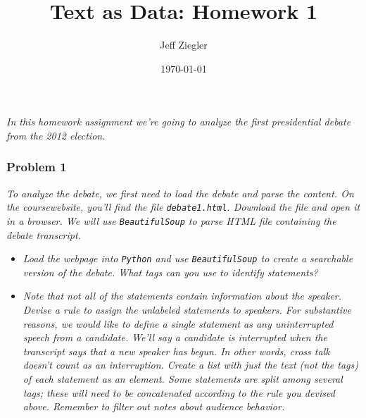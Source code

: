 \documentclass[12pt,letterpaper]{article}
\title{Text as Data: Homework 1}
\date{\today}
\author{Jeff Ziegler}
\begin{document}
\maketitle

\noindent \textit{In this homework assignment we're going to analyze the first presidential debate from the 2012 election.}  \\

\subsubsection*{Problem 1}
\textit{To analyze the debate, we first need to load the debate and parse the content.  On the coursewebsite, you'll find the file {\tt debate1.html}.  Download the file and open it in a browser. We will use {\tt BeautifulSoup} to parse HTML file containing the debate transcript.}

\begin{itemize}
\item \textit{Load the webpage into {\tt Python} and use {\tt BeautifulSoup} to create a searchable version of the debate. What tags can you use to identify statements?}



\item \textit{Note that not all of the statements contain information about the speaker. Devise a rule to assign the unlabeled statements to speakers. For substantive reasons, we would like to define a single statement as any \textit{uninterrupted} speech from a candidate. We'll say a candidate is interrupted when the transcript says that a new speaker has begun.  In other words, cross talk doesn't count as an interruption. Create a list with just the text (not the tags) of each statement as an element. Some statements are split among several tags; these will need to be concatenated according to the rule you devised above. Remember to filter out notes about audience behavior.}



\end{itemize}
\end{document}
